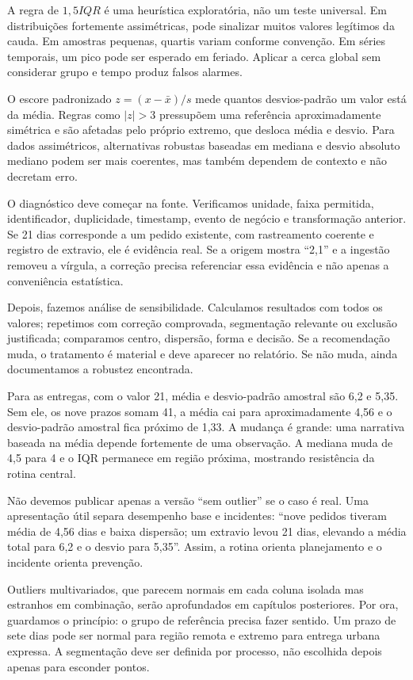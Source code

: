 A regra de $1{,}5IQR$ é uma heurística exploratória, não um teste universal. Em distribuições fortemente assimétricas, pode sinalizar muitos valores legítimos da cauda. Em amostras pequenas, quartis variam conforme convenção. Em séries temporais, um pico pode ser esperado em feriado. Aplicar a cerca global sem considerar grupo e tempo produz falsos alarmes.

O escore padronizado $z=(x-\bar{x})/s$ mede quantos desvios-padrão um valor está da média. Regras como $|z|>3$ pressupõem uma referência aproximadamente simétrica e são afetadas pelo próprio extremo, que desloca média e desvio. Para dados assimétricos, alternativas robustas baseadas em mediana e desvio absoluto mediano podem ser mais coerentes, mas também dependem de contexto e não decretam erro.

O diagnóstico deve começar na fonte. Verificamos unidade, faixa permitida, identificador, duplicidade, timestamp, evento de negócio e transformação anterior. Se 21 dias corresponde a um pedido existente, com rastreamento coerente e registro de extravio, ele é evidência real. Se a origem mostra ``2,1'' e a ingestão removeu a vírgula, a correção precisa referenciar essa evidência e não apenas a conveniência estatística.

Depois, fazemos análise de sensibilidade. Calculamos resultados com todos os valores; repetimos com correção comprovada, segmentação relevante ou exclusão justificada; comparamos centro, dispersão, forma e decisão. Se a recomendação muda, o tratamento é material e deve aparecer no relatório. Se não muda, ainda documentamos a robustez encontrada.

Para as entregas, com o valor 21, média e desvio-padrão amostral são 6,2 e 5,35. Sem ele, os nove prazos somam 41, a média cai para aproximadamente 4,56 e o desvio-padrão amostral fica próximo de 1,33. A mudança é grande: uma narrativa baseada na média depende fortemente de uma observação. A mediana muda de 4,5 para 4 e o IQR permanece em região próxima, mostrando resistência da rotina central.

Não devemos publicar apenas a versão ``sem outlier'' se o caso é real. Uma apresentação útil separa desempenho base e incidentes: ``nove pedidos tiveram média de 4,56 dias e baixa dispersão; um extravio levou 21 dias, elevando a média total para 6,2 e o desvio para 5,35''. Assim, a rotina orienta planejamento e o incidente orienta prevenção.

Outliers multivariados, que parecem normais em cada coluna isolada mas estranhos em combinação, serão aprofundados em capítulos posteriores. Por ora, guardamos o princípio: o grupo de referência precisa fazer sentido. Um prazo de sete dias pode ser normal para região remota e extremo para entrega urbana expressa. A segmentação deve ser definida por processo, não escolhida depois apenas para esconder pontos.

